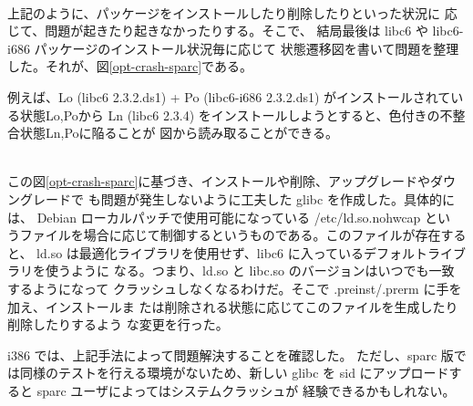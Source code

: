 \documentclass[mingoth]{jsarticle}
\newcommand{\subsubsubsection}[1]{%
\vspace{1zw}{\bf #1}\\}
\begin{document}
   \subsubsubsection{状態遷移図の登場}

    上記のように、パッケージをインストールしたり削除したりといった状況に
    応じて、問題が起きたり起きなかったりする。そこで、
    結局最後は libc6 や libc6-i686 パッケージのインストール状況毎に応じて
    状態遷移図を書いて問題を整理した。それが、図\ref{opt-crash-sparc}である。

    例えば、Lo (libc6 2.3.2.ds1) + Po (libc6-i686 2.3.2.ds1) がインストールされている状態Lo,Poから
    Ln (libc6 2.3.4) をインストールしようとすると、色付きの不整合状態Ln,Poに陥ることが
    図から読み取ることができる。

   \subsubsubsection{解決策}

    この図\ref{opt-crash-sparc}に基づき、インストールや削除、アップグレードやダウングレードで
    も問題が発生しないように工夫した glibc を作成した。具体的には、
    Debian ローカルパッチで使用可能になっている /etc/ld.so.nohwcap とい
    うファイルを場合に応じて制御するというものである。このファイルが存在すると、
    ld.so は最適化ライブラリを使用せず、libc6 に入っているデフォルトライブラリを使うように
    なる。つまり、ld.so と libc.so のバージョンはいつでも一致するようになって
    クラッシュしなくなるわけだ。そこで .preinst/.prerm に手を加え、インストールま
    たは削除される状態に応じてこのファイルを生成したり削除したりするよう
    な変更を行った。

    i386 では、上記手法によって問題解決することを確認した。
    ただし、sparc 版では同様のテストを行える環境がないため、新しい glibc を
    sid にアップロードすると sparc ユーザによってはシステムクラッシュが
    経験できるかもしれない。
\end{document}
